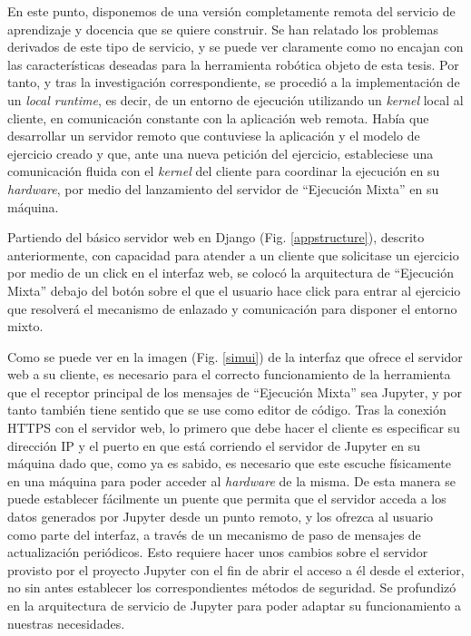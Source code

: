En este punto, disponemos de una versión completamente remota del servicio de aprendizaje y docencia que se quiere construir. Se han relatado los problemas derivados de este tipo de servicio, y se puede ver claramente como no encajan con las características deseadas para la herramienta robótica objeto de esta tesis. Por tanto, y tras la investigación correspondiente, se procedió a la implementación de un \textit{local runtime}, es decir, de un entorno de ejecución utilizando un \textit{kernel} local al cliente, en comunicación constante con la aplicación web remota. Había que desarrollar un servidor remoto que contuviese la aplicación y el modelo de ejercicio creado y que, ante una nueva petición del ejercicio, estableciese una comunicación fluida con el \textit{kernel} del cliente para coordinar la ejecución en su \textit{hardware}, por medio del lanzamiento del servidor de ``Ejecución Mixta'' en su máquina. 

Partiendo del básico servidor web en Django (Fig. \ref{appstructure}), descrito anteriormente, con capacidad para atender a un cliente que solicitase un ejercicio por medio de un click en el interfaz web, se colocó la arquitectura de ``Ejecución Mixta'' debajo del botón sobre el que el usuario hace click para entrar al ejercicio que resolverá el mecanismo de enlazado y comunicación para disponer el entorno mixto.

Como se puede ver en la imagen (Fig. \ref{simui}) de la interfaz que ofrece el servidor web a su cliente, es necesario para el correcto funcionamiento de la herramienta que el receptor principal de los mensajes de ``Ejecución Mixta'' sea Jupyter, y por tanto también tiene sentido que se use como editor de código. Tras la conexión HTTPS con el servidor web, lo primero que debe hacer el cliente es especificar su dirección IP y el puerto en que está corriendo el servidor de Jupyter en su máquina dado que, como ya es sabido, es necesario que este escuche físicamente en una máquina para poder acceder al \textit{hardware} de la misma. De esta manera se puede establecer fácilmente un puente que permita que el servidor acceda a los datos generados por Jupyter desde un punto remoto, y los ofrezca al usuario como parte del interfaz, a través de un mecanismo de paso de mensajes de actualización periódicos. Esto requiere hacer unos cambios sobre el servidor provisto por el proyecto Jupyter con el fin de abrir el acceso a él desde el exterior, no sin antes establecer los correspondientes métodos de seguridad. Se profundizó en la arquitectura de servicio de Jupyter para poder adaptar su funcionamiento a nuestras necesidades.

